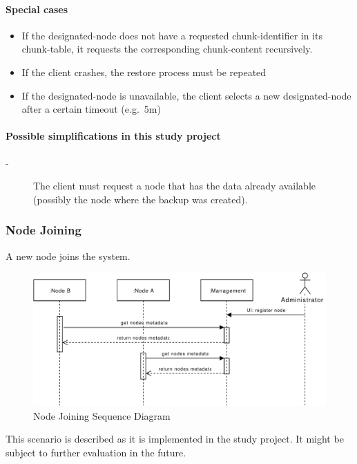 \paragraph{Special cases}
\begin{itemize}
    \item If the \gls{designated-node} does not have a requested \gls{chunk-identifier} in its \gls{chunk-table}, it requests the corresponding \gls{chunk-content} recursively.
    \item If the \gls{client} crashes, the restore process must be repeated
    \item If the \gls{designated-node} is unavailable, the \gls{client} selects a new \gls{designated-node} after a certain timeout (e.g.\ 5m)
\end{itemize}

\paragraph{Possible simplifications in this study project}
\begin{description}
    \item[-] The client must request a node that has the data already available (possibly the node where the backup was created).
\end{description}


\subsubsection{Node Joining}\label{sec:scenario-node-join}
A new node joins the system.

\begin{figure}[h]
    \centering
    \includegraphics[width=\linewidth]{resources/node_joining.pdf}
    \caption{Node Joining Sequence Diagram}
    \label{fig:node-joining}
\end{figure}

This scenario is described as it is implemented in the study project. It might be subject to further evaluation in the future.

